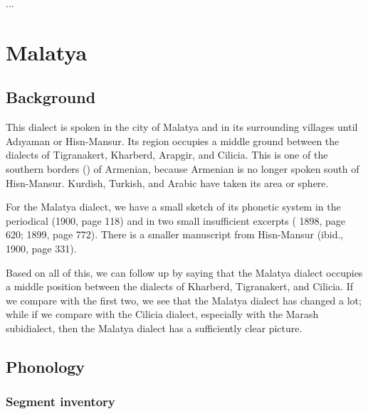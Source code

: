 ...




\chapter{Malatya} \label{chapter:Malatya}
\section{Background}
\begin{adjarianpage}\label{page:196}\end{adjarianpage}%


This dialect is spoken in the city of Malatya and in its surrounding villages until Adıyaman or Hisn-Mansur. Its region occupies a middle ground between the dialects of Tigranakert, Kharberd, Arapgir, and Cilicia. This is one of the southern borders () of Armenian, because Armenian is no longer spoken south of Hisn-Mansur. Kurdish, Turkish, and Arabic have taken its area or sphere. 

For the Malatya dialect, we have a small sketch of its phonetic system in the periodical  (1900, page 118) and in two small insufficient excerpts ( 1898, page 620; 1899, page 772). There is a smaller manuscript from Hisn-Mansur (ibid., 1900, page 331).

Based on all of this, we can follow up by saying that the Malatya dialect occupies a middle position between the dialects of Kharberd, Tigranakert, and Cilicia. If we compare with the first two, we see that the Malatya dialect has changed a lot; while if we compare with the Cilicia dialect, especially with the Marash subidialect, then the Malatya dialect has a sufficiently clear picture. 

\section{Phonology}
\subsection{Segment inventory}
